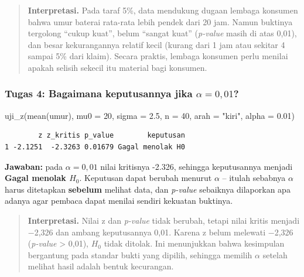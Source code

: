 \documentclass[
  indonesian,
  letterpaper,
]{book}
\newenvironment{Shaded}{\begin{snugshade}}{\end{snugshade}}
\newcommand{\AttributeTok}[1]{\textcolor[rgb]{0.40,0.45,0.13}{#1}}
\newcommand{\DecValTok}[1]{\textcolor[rgb]{0.68,0.00,0.00}{#1}}
\newcommand{\FloatTok}[1]{\textcolor[rgb]{0.68,0.00,0.00}{#1}}
\newcommand{\FunctionTok}[1]{\textcolor[rgb]{0.28,0.35,0.67}{#1}}
\newcommand{\NormalTok}[1]{\textcolor[rgb]{0.00,0.23,0.31}{#1}}
\newcommand{\StringTok}[1]{\textcolor[rgb]{0.13,0.47,0.30}{#1}}
\begin{document}
\begin{quote}
\textbf{Interpretasi.} Pada taraf 5\%, data mendukung dugaan lembaga
konsumen bahwa umur baterai rata-rata lebih pendek dari 20 jam. Namun
buktinya tergolong ``cukup kuat'', belum ``sangat kuat'' (\emph{p-value}
masih di atas 0,01), dan besar kekurangannya relatif kecil (kurang dari
1 jam atau sekitar 4 sampai 5\% dari klaim). Secara praktis, lembaga
konsumen perlu menilai apakah selisih sekecil itu material bagi
konsumen.
\end{quote}

\subsubsection{\texorpdfstring{Tugas 4: Bagaimana keputusannya jika
\(\alpha = 0{,}01\)?}{Tugas 4: Bagaimana keputusannya jika \textbackslash alpha = 0\{,\}01?}}\label{tugas-4-bagaimana-keputusannya-jika-alpha-001}

\begin{Shaded}
\begin{Highlighting}[]
\FunctionTok{uji\_z}\NormalTok{(}\FunctionTok{mean}\NormalTok{(umur), }\AttributeTok{mu0 =} \DecValTok{20}\NormalTok{, }\AttributeTok{sigma =} \FloatTok{2.5}\NormalTok{, }\AttributeTok{n =} \DecValTok{40}\NormalTok{, }\AttributeTok{arah =} \StringTok{"kiri"}\NormalTok{, }\AttributeTok{alpha =} \FloatTok{0.01}\NormalTok{)}
\end{Highlighting}
\end{Shaded}

\begin{verbatim}
        z z_kritis p_value        keputusan
1 -2.1251  -2.3263 0.01679 Gagal menolak H0
\end{verbatim}

\textbf{Jawaban:} pada \(\alpha = 0{,}01\) nilai kritisnya -2.326,
sehingga keputusannya menjadi \textbf{Gagal menolak \(H_0\)}. Keputusan
dapat berubah menurut \(\alpha\) -- itulah sebabnya \(\alpha\) harus
ditetapkan \textbf{sebelum} melihat data, dan \emph{p-value} sebaiknya
dilaporkan apa adanya agar pembaca dapat menilai sendiri kekuatan
buktinya.

\begin{quote}
\textbf{Interpretasi.} Nilai z dan \emph{p-value} tidak berubah, tetapi
nilai kritis menjadi −2,326 dan ambang keputusannya 0,01. Karena z belum
melewati −2,326 (\emph{p-value} \textgreater{} 0,01), \(H_0\) tidak
ditolak. Ini menunjukkan bahwa kesimpulan bergantung pada standar bukti
yang dipilih, sehingga memilih \(\alpha\) setelah melihat hasil adalah
bentuk kecurangan.
\end{quote}
\end{document}
